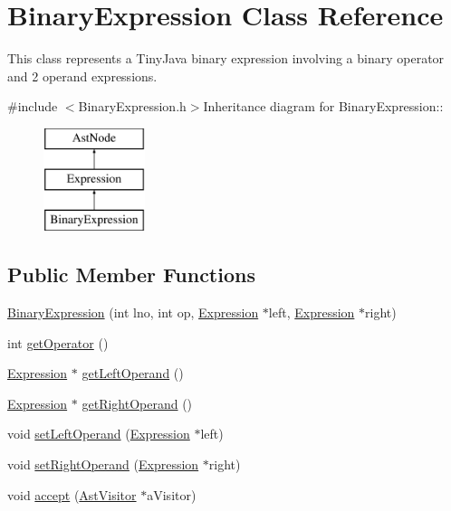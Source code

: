\hypertarget{classBinaryExpression}{
\section{BinaryExpression Class Reference}
\label{classBinaryExpression}
}


This class represents a TinyJava binary expression involving a binary operator and 2 operand expressions.  


{\ttfamily \#include $<$BinaryExpression.h$>$}Inheritance diagram for BinaryExpression::\begin{figure}[H]
\begin{center}
\leavevmode
\includegraphics[height=3cm]{classBinaryExpression}
\end{center}
\end{figure}
\subsection*{Public Member Functions}
\begin{DoxyCompactItemize}
\item 
\hyperlink{classBinaryExpression_af36e7f9f5222b93f030748384c631eb0}{BinaryExpression} (int lno, int op, \hyperlink{classExpression}{Expression} $\ast$left, \hyperlink{classExpression}{Expression} $\ast$right)
\item 
int \hyperlink{classBinaryExpression_af2d7644a8e57083fe9c550cf02900068}{getOperator} ()
\item 
\hyperlink{classExpression}{Expression} $\ast$ \hyperlink{classBinaryExpression_a0b8e6e09079d13b029c1fae785e0be01}{getLeftOperand} ()
\item 
\hyperlink{classExpression}{Expression} $\ast$ \hyperlink{classBinaryExpression_a49ee8f4a0fbed5656fbd0c37446e8f82}{getRightOperand} ()
\item 
void \hyperlink{classBinaryExpression_a2bf7fd38f96a775a988bfb6b7838d9bf}{setLeftOperand} (\hyperlink{classExpression}{Expression} $\ast$left)
\item 
void \hyperlink{classBinaryExpression_a78f08f420bbba62af7fc8693bde2fb76}{setRightOperand} (\hyperlink{classExpression}{Expression} $\ast$right)
\item 
void \hyperlink{classBinaryExpression_a2af7e73b6a90c216ef00b6297ce83da5}{accept} (\hyperlink{classAstVisitor}{AstVisitor} $\ast$aVisitor)
\end{DoxyCompactItemize}


